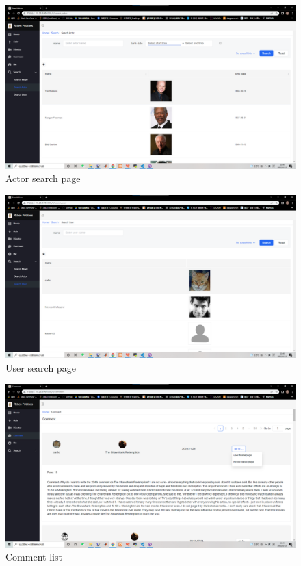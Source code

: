 \begin{CJK*}{UTF8}{gbsn}
    \begin{figure}[htbp]
    \centering
    \includegraphics[width=1\textwidth]{res_search8.png}
    \caption{Actor search page}
    \end{figure}
    
    \begin{figure}[htbp]
    \centering
    \includegraphics[width=1\textwidth]{res_search9.png}
    \caption{User search page}
    \end{figure}
    
    \begin{figure}[htbp]
    \centering
    \includegraphics[width=1\textwidth]{res_comment1.png}
    \caption{Comment list}
    \end{figure}
    

\end{CJK*}
